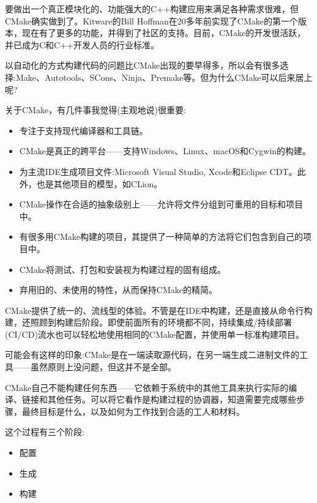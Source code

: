 要做出一个真正模块化的、功能强大的C++构建应用来满足各种需求很难，但CMake确实做到了。Kitware的Bill Hoffman在20多年前实现了CMake的第一个版本，现在有了更多的功能，并得到了社区的支持。目前，CMake的开发很活跃，并已成为C和C++开发人员的行业标准。

以自动化的方式构建代码的问题比CMake出现的要早得多，所以会有很多选择:Make、Autotools、SCons、Ninja、Premake等。但为什么CMake可以后来居上呢?

关于CMake，有几件事我觉得(主观地说)很重要:

\begin{itemize}
\item 
专注于支持现代编译器和工具链。

\item 
CMake是真正的跨平台——支持Windows、Linux、macOS和Cygwin的构建。

\item 
为主流IDE生成项目文件:Microsoft Visual Studio, Xcode和Eclipse CDT。此外，也是其他项目的模型，如CLion。

\item 
CMake操作在合适的抽象级别上——允许将文件分组到可重用的目标和项目中。

\item 
有很多用CMake构建的项目，其提供了一种简单的方法将它们包含到自己的项目中。

\item 
CMake将测试、打包和安装视为构建过程的固有组成。

\item 
弃用旧的、未使用的特性，从而保持CMake的精简。
\end{itemize}

CMake提供了统一的、流线型的体验。不管是在IDE中构建，还是直接从命令行构建，还照顾到构建后阶段。即使前面所有的环境都不同，持续集成/持续部署(CI/CD)流水也可以轻松地使用相同的CMake配置，并使用单一标准构建项目。


可能会有这样的印象:CMake是在一端读取源代码，在另一端生成二进制文件的工具——虽然原则上没问题，但这并不是全部。

CMake自己不能构建任何东西——它依赖于系统中的其他工具来执行实际的编译、链接和其他任务。可以将它看作是构建过程的协调器，知道需要完成哪些步骤，最终目标是什么，以及如何为工作找到合适的工人和材料。

这个过程有三个阶段:

\begin{itemize}
\item 
配置

\item 
生成

\item 
构建
\end{itemize}

